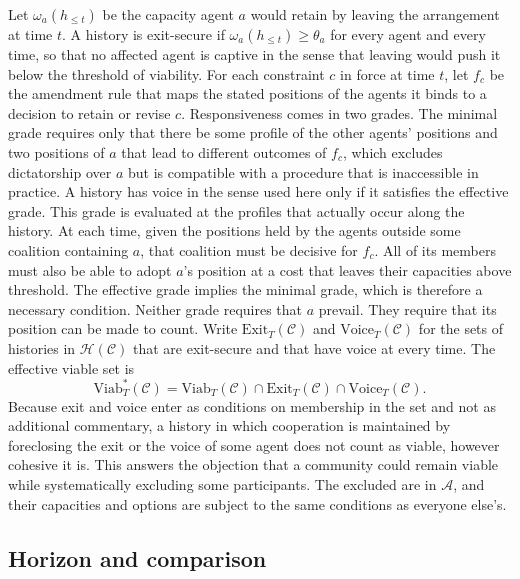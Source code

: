 \documentclass[12pt]{article}
\begin{document}
Let $\omega_a(h_{\le t})$ be the capacity agent $a$ would retain by leaving the arrangement at time $t$. A history is exit-secure if $\omega_a(h_{\le t})\ge\theta_a$ for every agent and every time, so that no affected agent is captive in the sense that leaving would push it below the threshold of viability. For each constraint $c$ in force at time $t$, let $f_c$ be the amendment rule that maps the stated positions of the agents it binds to a decision to retain or revise $c$. Responsiveness comes in two grades. The minimal grade requires only that there be some profile of the other agents' positions and two positions of $a$ that lead to different outcomes of $f_c$, which excludes dictatorship over $a$ but is compatible with a procedure that is inaccessible in practice. A history has voice in the sense used here only if it satisfies the effective grade. This grade is evaluated at the profiles that actually occur along the history. At each time, given the positions held by the agents outside some coalition containing $a$, that coalition must be decisive for $f_c$. All of its members must also be able to adopt $a$'s position at a cost that leaves their capacities above threshold. The effective grade implies the minimal grade, which is therefore a necessary condition. Neither grade requires that $a$ prevail. They require that its position can be made to count. Write $\mathrm{Exit}_T(\mathcal C)$ and $\mathrm{Voice}_T(\mathcal C)$ for the sets of histories in $\mathcal H(\mathcal C)$ that are exit-secure and that have voice at every time. The effective viable set is
\[
\mathrm{Viab}^{*}_T(\mathcal C)=\mathrm{Viab}_T(\mathcal C)\cap\mathrm{Exit}_T(\mathcal C)\cap\mathrm{Voice}_T(\mathcal C).
\]
Because exit and voice enter as conditions on membership in the set and not as additional commentary, a history in which cooperation is maintained by foreclosing the exit or the voice of some agent does not count as viable, however cohesive it is. This answers the objection that a community could remain viable while systematically excluding some participants. The excluded are in $\mathcal A$, and their capacities and options are subject to the same conditions as everyone else's.

\subsection{Horizon and comparison}
\end{document}
